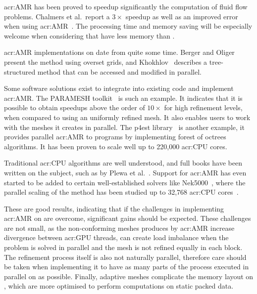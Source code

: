 \Acrshort{acr:AMR} has been proved to speedup significantly the computation of fluid flow problems.
Chalmers et al.\ report a \(3 \times \) speedup as well as an improved error when using
\acrshort{acr:AMR}~\cite{Chalmers2019}. The processing time and memory saving will be especially
welcome when considering that  have less memory than .

\Acrshort{acr:AMR} implementations on  date from quite some time. Berger and
Oliger~\cite{Berger1984} present the method using overset grids, and Khokhlov~\cite{Khokhlov1998}
describes a tree-structured method that can be accessed and modified in parallel.

Some software solutions exist to integrate into existing code and implement \acrlong{acr:AMR}. The
PARAMESH toolkit~\cite{MacNeice2000} is such an example. It indicates that it is possible to obtain
speedups above the order of \( 10 \times \) for high refinement levels, when compared to using an
uniformly refined mesh. It also enables users to work with the meshes it creates in parallel. The
p4est library~\cite{Burstedde2011} is another example, it provides parallel \acrshort{acr:AMR} to
programs by implementing forest of octrees algorithms. It has been proven to scale well up to
220,000 \acrshort{acr:CPU} cores.

Traditional \acrshort{acr:CPU} algorithms are well understood, and full books have been written on
the subject, such as by Plewa et al.~\cite{Plewa2005}. Support for \acrshort{acr:AMR} has even
started to be added to certain well-established solvers like Nek5000~\cite{Offermans2019}, where the
parallel scaling of the method has been studied up to 32,768 \acrshort{acr:CPU}
cores~\cite{Peplinski2016}. 

These are good results, indicating that if the challenges in implementing \acrshort{acr:AMR} on
 are overcome, significant gains should be expected. These challenges are not
small, as the non-conforming meshes produces by \acrshort{acr:AMR} increase divergence between
\acrshort{acr:GPU} threads, can create load imbalance when the problem is solved in parallel and the
mesh is not refined equally in each block. The refinement process itself is also not naturally
parallel, therefore care should be taken when implementing it to have as many parts of the process
executed in parallel on  as possible. Finally, adaptive meshes complicate the
memory layout on , which are more optimised to perform computations on static
packed data.


